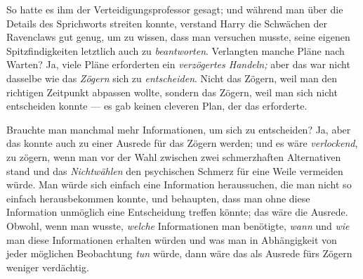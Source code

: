 
 

\hplettrineextrapara
So hatte es ihm der Verteidigungsprofessor gesagt; und während man über die Details des Sprichworts streiten konnte, verstand Harry die Schwächen der Ravenclaws gut genug, um zu wissen, dass man versuchen musste, seine eigenen Spitzfindigkeiten letztlich auch zu \emph{beantworten}. Verlangten manche Pläne nach Warten? Ja, viele Pläne erforderten ein \emph{verzögertes Handeln;} aber das war nicht dasselbe wie das \emph{Zögern} sich zu \emph{entscheiden}. Nicht das Zögern, weil man den richtigen Zeitpunkt abpassen wollte, sondern das Zögern, weil man sich nicht entscheiden konnte — es gab keinen cleveren Plan, der das erforderte.

Brauchte man manchmal mehr Informationen, um sich zu entscheiden? Ja, aber das konnte auch zu einer Ausrede für das Zögern werden; und es wäre \emph{verlockend}, zu zögern, wenn man vor der Wahl zwischen zwei schmerzhaften Alternativen stand und das \emph{Nichtwählen} den psychischen Schmerz für eine Weile vermeiden würde. Man würde sich einfach eine Information heraussuchen, die man nicht so einfach herausbekommen konnte, und behaupten, dass man ohne diese Information unmöglich eine Entscheidung treffen könnte; das wäre die Ausrede. Obwohl, wenn man wusste, \emph{welche} Informationen man benötigte, \emph{wann} und \emph{wie} man diese Informationen erhalten würden und was man in Abhängigkeit von jeder möglichen Beobachtung \emph{tun} würde, dann wäre das als Ausrede fürs Zögern weniger verdächtig.

